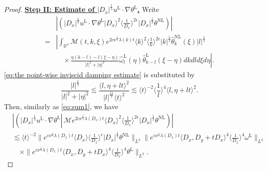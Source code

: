 \documentclass[reqno, 12pt]{amsart} %
\theoremstyle{plain} %
\theoremstyle{definition}
\theoremstyle{remark}
\numberwithin{equation}{section} %
\newcommand{\lt}{\left}
\newcommand{\rt}{\right}
\newcommand{\abs}[1]{\lvert#1\rvert}  %
\begin{document}
\begin{proof}
		
		\underline{\bf Step II: Estimate of $ |D_x|^\frac13 u^{\mathrm{L}} \cdot  \nabla  \theta^{\mathrm{L}}$.} 
		Write
		\begin{equation*}\begin{aligned} \label{eq:temp11}
				& \left|\left( |D_x|^\frac13 u^{\mathrm{L}} \cdot \nabla  \theta^{\mathrm{L}} \big| D_x\rangle^2\langle\frac{1}{D_x}\rangle^{2 \epsilon} |D_x|^\frac13 \theta^{\mathrm{NL}}\right)\right| \\
				= & \left|\int_{\mathbb{R}^4} \mathcal{M}(t, k, \xi) e^{2 c \nu^{\frac{1}{3}} \lambda(k) t}\langle k\rangle^2\langle\frac{1}{k}\rangle^{2 \epsilon} |k|^\frac13  \hat{\theta }_k^{\mathrm{NL}}(\xi) |l|^\frac13 \rt. \\
				& \lt. \quad \times  \frac{\eta(k-l)-l(\xi-\eta)}{|l|^2+|\eta|^2} \hat{\omega}_l^{\mathrm{L}}(\eta) \hat{\theta }_{k-l}^{\mathrm{L}}(\xi-\eta) d k d l d \xi d \eta\right|.
		\end{aligned}\end{equation*}
		\eqref{eq:the point-wise inviscid damping estimate} is substituted by 
		\begin{equation*} 
			\frac{|l|^\frac13}{|l|^2+|\eta|^2} \lesssim \frac{\langle l, \eta+l t\rangle^2}{|l|^{\frac{11}{3}}\langle t\rangle^2} \lesssim\langle t\rangle^{-2}\langle\frac{1}{l}\rangle^4\langle l, \eta+l t\rangle^2.
		\end{equation*}
		Then, similarly as \eqref{eq:sum1}, we have
		\begin{equation*}\begin{aligned} \label{eq:sum2}
				&\left|\left( |D_x|^\frac13 u^{\mathrm{L}} \cdot \nabla  \theta^{\mathrm{L}} \left\lvert\, \mathcal{M} e^{2 c \nu^{\frac{1}{3}} \lambda\left(D_x\right) t}\langle D_x\rangle^2\langle\frac{1}{D_x}\rangle^{2 \epsilon} |D_x|^\frac13 \theta^{\mathrm{NL}}\right.\right)\right| \\
				& \lesssim\langle t\rangle^{-2} \|e^{c \nu^{\frac{1}{3}} \lambda\left(D_x\right) t}\langle D_x\rangle  \langle \frac{1}{D_x}\rangle^\epsilon |D_x|^\frac13  \theta^{\mathrm{NL}}\|_{L^2}    \|e^{c \nu^{\frac{1}{3}} \lambda\left(D_x\right) t}\langle D_x, D_y + tD_x\rangle^4 \langle\frac{1}{D_x}\rangle^4 \omega^{\mathrm{L}} \|_{L^2} \\
				&\quad \times \|e^{c \nu^{\frac{1}{3}} \lambda\left(D_x\right) t}\langle D_x, D_y + tD_x\rangle^4\langle\frac{1}{D_x}\rangle^4   \theta^{\mathrm{L}} \|_{L^2}.
		\end{aligned}\end{equation*}

\end{proof}
\end{document}
